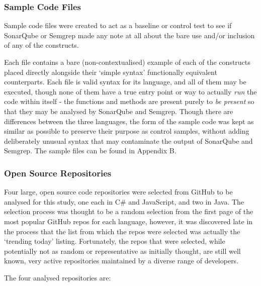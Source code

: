 \documentclass{article}
\begin{document}
        \subsubsection{Sample Code Files}
        \label{subsubsec:sampleFile}
            Sample code files were created to act as a baseline or control test to see if SonarQube or Semgrep made any note at all about the bare use and/or inclusion of any of the constructs.

            Each file contains a bare (non-contextualised) example of each of the constructs placed directly alongside their `simple syntax' functionally equivalent counterparts. Each file is valid syntax for its language, and all of them may be executed, though none of them have a true entry point or way to actually \emph{run} the code within itself - the functions and methods are present purely to \emph{be present} so that they may be analysed by SonarQube and Semgrep. Though there are differences between the three languages, the form of the sample code was kept as similar as possible to preserve their purpose as control samples, without adding deliberately unusual syntax that may contaminate the output of SonarQube and Semgrep. The sample files can be found in Appendix B.
        \subsubsection{Open Source Repositories}
        \label{subsubsec:osRepos}
            Four large, open source code repositories were selected from GitHub to be analysed for this study, one each in C\# and JavaScript, and two in Java. The selection process was thought to be a random selection from the first page of the most popular GitHub repos for each language, however, it was discovered late in the process that the list from which the repos were selected was actually the `trending today' listing.  Fortunately, the repos that were selected, while potentially not as random or representative as initially thought, are still well known, very active repositories maintained by a diverse range of developers.

            The four analysed repositories are:
\end{document}
